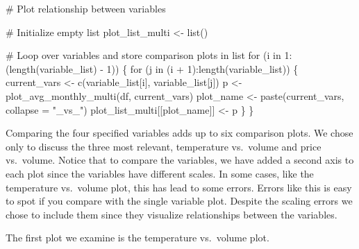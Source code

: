 \documentclass[
  letterpaper,
  DIV=11,
  numbers=noendperiod]{scrartcl}
\newenvironment{Shaded}{\begin{snugshade}}{\end{snugshade}}
\newcommand{\AttributeTok}[1]{\textcolor[rgb]{0.40,0.45,0.13}{#1}}
\newcommand{\CommentTok}[1]{\textcolor[rgb]{0.37,0.37,0.37}{#1}}
\newcommand{\ControlFlowTok}[1]{\textcolor[rgb]{0.00,0.23,0.31}{#1}}
\newcommand{\DecValTok}[1]{\textcolor[rgb]{0.68,0.00,0.00}{#1}}
\newcommand{\FunctionTok}[1]{\textcolor[rgb]{0.28,0.35,0.67}{#1}}
\newcommand{\NormalTok}[1]{\textcolor[rgb]{0.00,0.23,0.31}{#1}}
\newcommand{\OtherTok}[1]{\textcolor[rgb]{0.00,0.23,0.31}{#1}}
\newcommand{\SpecialCharTok}[1]{\textcolor[rgb]{0.37,0.37,0.37}{#1}}
\newcommand{\StringTok}[1]{\textcolor[rgb]{0.13,0.47,0.30}{#1}}
\begin{document}
\begin{Shaded}
\begin{Highlighting}[]
\CommentTok{\# Plot relationship between variables}

\CommentTok{\# Initialize empty list}
\NormalTok{plot\_list\_multi }\OtherTok{\textless{}{-}} \FunctionTok{list}\NormalTok{()}

\CommentTok{\# Loop over variables and store comparison plots in list}
\ControlFlowTok{for}\NormalTok{ (i }\ControlFlowTok{in} \DecValTok{1}\SpecialCharTok{:}\NormalTok{(}\FunctionTok{length}\NormalTok{(variable\_list) }\SpecialCharTok{{-}} \DecValTok{1}\NormalTok{)) \{}
  \ControlFlowTok{for}\NormalTok{ (j }\ControlFlowTok{in}\NormalTok{ (i }\SpecialCharTok{+} \DecValTok{1}\NormalTok{)}\SpecialCharTok{:}\FunctionTok{length}\NormalTok{(variable\_list)) \{}
\NormalTok{    current\_vars }\OtherTok{\textless{}{-}} \FunctionTok{c}\NormalTok{(variable\_list[i], variable\_list[j])}
\NormalTok{    p }\OtherTok{\textless{}{-}} \FunctionTok{plot\_avg\_monthly\_multi}\NormalTok{(df, current\_vars)}
\NormalTok{    plot\_name }\OtherTok{\textless{}{-}} \FunctionTok{paste}\NormalTok{(current\_vars, }\AttributeTok{collapse =} \StringTok{"\_vs\_"}\NormalTok{)}
\NormalTok{    plot\_list\_multi[[plot\_name]] }\OtherTok{\textless{}{-}}\NormalTok{ p}
\NormalTok{  \}}
\NormalTok{\}}
\end{Highlighting}
\end{Shaded}

Comparing the four specified variables adds up to six comparison plots.
We chose only to discuss the three most relevant, temperature vs.~volume
and price vs.~volume. Notice that to compare the variables, we have
added a second axis to each plot since the variables have different
scales. In some cases, like the temperature vs.~volume plot, this has
lead to some errors. Errors like this is easy to spot if you compare
with the single variable plot. Despite the scaling errors we chose to
include them since they visualize relationships between the variables.

The first plot we examine is the temperature vs.~volume plot.

\begin{Shaded}
\end{Shaded}
\end{document}
